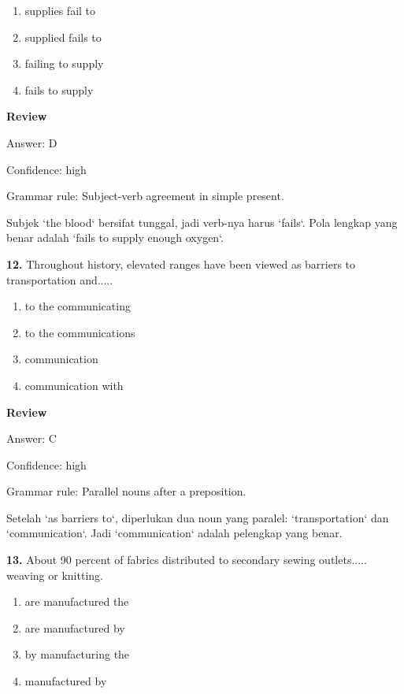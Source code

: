 \documentclass[12pt]{article}
\begin{document}
\begin{enumerate}[label=(\Alph*),leftmargin=*,itemsep=0.2em]
\item supplies fail to
\item supplied fails to
\item failing to supply
\item fails to supply
\end{enumerate}
\par
\begingroup
\setlength{\parskip}{0pt}
\setlength{\parindent}{0pt}
\textbf{Review}\par
Answer: D\par
Confidence: high\par
Grammar rule: Subject-verb agreement in simple present.\par
Subjek `the blood` bersifat tunggal, jadi verb-nya harus `fails`. Pola lengkap yang benar adalah `fails to supply enough oxygen`.\par
\endgroup
\par
\vspace{0.25\baselineskip}
\noindent\textbf{12.} Throughout history, elevated ranges have been viewed as barriers to transportation and.....
\begin{enumerate}[label=(\Alph*),leftmargin=*,itemsep=0.2em]
\item to the communicating
\item to the communications
\item communication
\item communication with
\end{enumerate}
\par
\begingroup
\setlength{\parskip}{0pt}
\setlength{\parindent}{0pt}
\textbf{Review}\par
Answer: C\par
Confidence: high\par
Grammar rule: Parallel nouns after a preposition.\par
Setelah `as barriers to`, diperlukan dua noun yang paralel: `transportation` dan `communication`. Jadi `communication` adalah pelengkap yang benar.\par
\endgroup
\par
\vspace{0.25\baselineskip}
\noindent\textbf{13.} About 90 percent of fabrics distributed to secondary sewing outlets..... weaving or knitting.
\begin{enumerate}[label=(\Alph*),leftmargin=*,itemsep=0.2em]
\item are manufactured the
\item are manufactured by
\item by manufacturing the
\item manufactured by
\end{enumerate}
\end{document}
